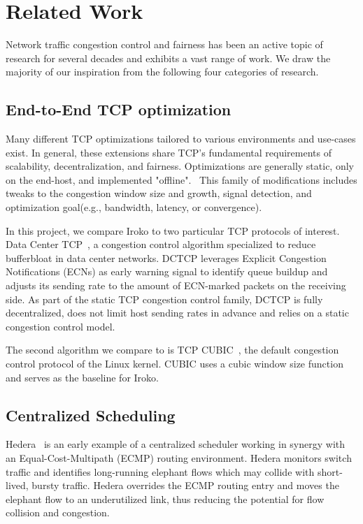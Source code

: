 \section{Related Work}
\label{sec:related}
Network traffic congestion control and fairness has been an active topic of 
research for several decades and exhibits a vast range of work. We draw the 
majority of our inspiration from the following four categories of research.

\subsection{End-to-End TCP optimization}
Many different TCP optimizations tailored to various environments and use-cases 
exist. In general, these extensions share TCP's fundamental requirements of 
scalability, decentralization, and fairness. Optimizations are generally 
static, only on the end-host, and implemented "offline".~\cite{throwdown} This 
family of modifications includes tweaks to the congestion window size and 
growth, signal detection, and optimization goal(e.g., bandwidth, latency, or 
convergence).~\cite{tcp_family}

In this project, we compare Iroko to two particular TCP protocols of interest.  
Data Center TCP~\cite{dctcp}, a congestion control algorithm specialized to 
reduce bufferbloat in data center networks. DCTCP leverages Explicit Congestion 
Notifications (ECNs) as early warning signal to identify queue buildup and 
adjusts its sending rate to the amount of ECN-marked packets on the receiving 
side. As part of the static TCP congestion control family, DCTCP is fully 
decentralized, does not limit host sending rates in advance and relies on a 
static congestion control model.

The second algorithm we compare to is TCP CUBIC~\cite{cubic}, the default 
congestion control protocol of the Linux kernel. CUBIC uses a cubic window size 
function and serves as the baseline for Iroko.

\subsection{Centralized Scheduling}
Hedera~\cite{hedera} is an early example of a centralized scheduler working in 
synergy with an Equal-Cost-Multipath (ECMP) routing environment. Hedera 
monitors switch traffic and identifies long-running elephant flows which may 
collide with short-lived, bursty traffic. Hedera overrides the ECMP routing 
entry and moves the elephant flow to an underutilized link, thus reducing the 
potential for flow collision and congestion.


